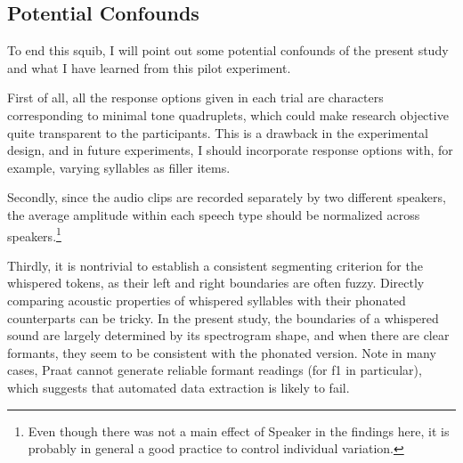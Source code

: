 \documentclass[12pt,letterpaper]{scrartcl}
\begin{document}
\subsection{Potential Confounds}

To end this squib, I will point out some potential confounds of the present study and what I have learned from this pilot experiment.

First of all, all the response options given in each trial are characters corresponding to minimal tone quadruplets, which could make research objective quite transparent to the participants. This is a drawback in the experimental design, and in future experiments, I should incorporate response options with, for example, varying syllables as filler items.

Secondly, since the audio clips are recorded separately by two different speakers, the average amplitude within each speech type should be normalized across speakers.\footnote{Even though there was not a main effect of Speaker in the findings here, it is probably in general a good practice to control individual variation.}

Thirdly, it is nontrivial to establish a consistent segmenting criterion for the whispered tokens, as their left and right boundaries are often fuzzy. Directly comparing acoustic properties of whispered syllables with their phonated counterparts can be tricky. In the present study, the boundaries of a whispered sound are largely determined by its spectrogram shape, and when there are clear formants, they seem to be consistent with the phonated version. Note in many cases, Praat cannot generate reliable formant readings (for f1 in particular), which suggests that automated data extraction is likely to fail. %

\newpage
\printbibliography
\end{document}
